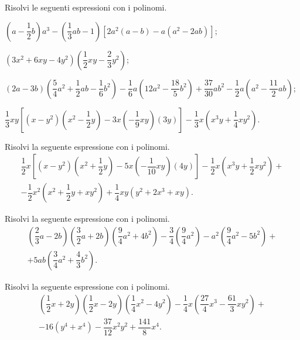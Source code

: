 \begin{esercizio}[\Ast]
Risolvi le seguenti espressioni con i polinomi.
 \begin{enumeratea}
 \item $\left(a-\dfrac{1}{2}b\right)a^{3}-\left(\dfrac{1}{3}{ab}-1\right)\left[2a^{2}(a-b)-a\left(a^{2}-2{ab}\right)\right]$;
 \item $\left(3x^2+6xy-4y^2\right)\left(\dfrac{1}{2}xy-\dfrac{2}{3}y^2\right)$;
 \item $(2a-3b)\left(\dfrac{5}{4}a^{2}+\dfrac{1}{2}{ab}-\dfrac{1}{6}b^{2}\right)-\dfrac{1}{6}a\left(12a^{2}-\dfrac{18}{5}b^{2}\right)+\dfrac{37}{30}ab^{2}-\dfrac{1}{2}a\left(a^{2}-\dfrac{11}{2}{ab}\right)$;
 \item $\dfrac{1}{3}xy\left[\left(x-y^{2}\right)\left(x^{2}-\dfrac{1}{2}y\right)-3x\left(-{\dfrac{1}{9}xy}\right)\left(3y\right)\right]-\dfrac{1}{3}x\left(x^{3}y+\dfrac{1}{4}xy^{2}\right)$.
 \end{enumeratea}
\end{esercizio}

\begin{esercizio}[\Ast]
Risolvi la seguente espressione con i polinomi.
\begin{multline*}
\dfrac{1}{2}x\left[\left(x-y^{2}\right)\left(x^{2}+\dfrac{1}{2}y\right)-5x\left(-{\dfrac{1}{10}}{xy}\right)(4y)\right]-\dfrac{1}{2}x\left(x^{3}y+\dfrac{1}{2}xy^{2}\right)+\\
-\dfrac{1}{2}x^{2}\left(x^{2}+\dfrac{1}{2}y+{xy}^{2}\right)+\dfrac{1}{4}{xy}\left(y^{2}+2x^{3}+{xy}\right).
\end{multline*}
\end{esercizio}

\begin{esercizio}[\Ast]
Risolvi la seguente espressione con i polinomi.
\begin{multline*}
\left(\dfrac{2}{3}a-2b\right)\left(\dfrac{3}{2}a+2b\right)\left(\dfrac{9}{4}a^{2}+4b^{2}\right)-\dfrac{3}{4}\left(\dfrac{9}{4}a^{2}\right)-a^{2}\left(\dfrac{9}{4}a^{2}-5b^{2}\right)+\\
+5{ab}\left(\dfrac{3}{4}a^{2}+\dfrac{4}{3}b^{2}\right).
\end{multline*}
\end{esercizio}

\begin{esercizio}[\Ast]
Risolvi la seguente espressione con i polinomi.
\begin{multline*}
\left(\dfrac{1}{2}x+2y\right)\left(\dfrac{1}{2}x-2y\right)\left(\dfrac{1}{4}x^{2}-4y^{2}\right)-\dfrac{1}{4}x\left(\dfrac{27}{4}x^{3}-\dfrac{61}{3}xy^{2}\right)+\\
-16\left(y^{4}+x^{4}\right)-\dfrac{37}{12}x^{2}y^{2}+\dfrac{141}{8}x^{4}.
\end{multline*}
\end{esercizio}

